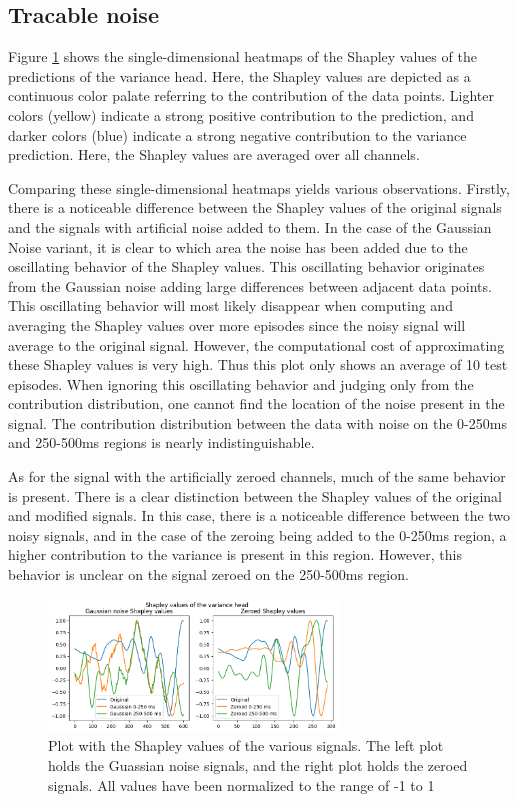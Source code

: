 \subsection{Tracable noise}

Figure \ref{fig:shap} shows the single-dimensional heatmaps of the Shapley values of the predictions of the variance head. Here, the Shapley values are depicted as a continuous color palate referring to the contribution of the data points. Lighter colors (yellow) indicate a strong positive contribution to the prediction, and darker colors (blue) indicate a strong negative contribution to the variance prediction. Here, the Shapley values are averaged over all channels.

Comparing these single-dimensional heatmaps yields various observations. Firstly, there is a noticeable difference between the Shapley values of the original signals and the signals with artificial noise added to them. In the case of the Gaussian Noise variant, it is clear to which area the noise has been added due to the oscillating behavior of the Shapley values. This oscillating behavior originates from the Gaussian noise adding large differences between adjacent data points. This oscillating behavior will most likely disappear when computing and averaging the Shapley values over more episodes since the noisy signal will average to the original signal. However, the computational cost of approximating these Shapley values is very high. Thus this plot only shows an average of 10 test episodes. When ignoring this oscillating behavior and judging only from the contribution distribution, one cannot find the location of the noise present in the signal. The contribution distribution between the data with noise on the 0-250ms and 250-500ms regions is nearly indistinguishable.

As for the signal with the artificially zeroed channels, much of the same behavior is present. There is a clear distinction between the Shapley values of the original and modified signals. In this case, there is a noticeable difference between the two noisy signals, and in the case of the zeroing being added to the 0-250ms region, a higher contribution to the variance is present in this region. However, this behavior is unclear on the signal zeroed on the 250-500ms region.

\begin{figure}[!tbp]
    \centering
        \includegraphics[width=7.7cm]{img/shap.png}
    \caption{Plot with the Shapley values of the various signals. The left plot holds the Guassian noise signals, and the right plot holds the zeroed signals. All values have been normalized to the range of -1 to 1}
    \label{fig:shap}
\end{figure}
